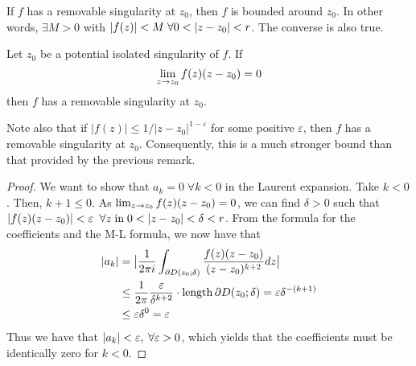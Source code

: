 \begin{remark}
    If $f$ has a removable singularity at $z_0$, then $f$ is bounded around $z_0$. In other words, $\exists M>0$ with $|f(z)|<M \fa 0<|z-z_0|<r$. The converse is also true.
\end{remark}

\begin{thm}
    Let $z_0$ be a potential isolated singularity of $f$. If
    \[\lim_{z\rightarrow z_0}f(z)(z-z_0)=0\]
    then $f$ has a removable singularity at $z_0$.
\end{thm}
\begin{remark}
    Note also that if $|f(z)|\leq 1/|z-z_0|^{1-\varepsilon}$ for some positive $\varepsilon$, then $f$ has a removable singularity at $z_0$.
    Consequently, this is a much stronger bound than that provided by the previous remark.
\end{remark}
\begin{proof}
    We want to show that $a_k=0\;\forall k<0$ in the Laurent expansion. Take $k<0$. Then, $k+1\leq0$.
    As $\lim_{z\rightarrow z_0}f(z)(z-z_0)=0$, we can find $\delta>0$ such that $|f(z)(z-z_0)|<\varepsilon\;\fa z \nm{in} 0<|z-z_0|<\delta<r$.
    From the formula for the coefficients and the M-L formula, we now have that
    \begin{align*}
        |a_k|&=\big|\frac{1}{2\pi i}\int_{\partial D(z_0;\delta)}\frac{f(z)(z-z_0)}{(z-z_0)^{k+2}}dz\big|\\
        &\leq \frac{1}{2\pi}\frac{\varepsilon}{\delta^{k+2}}\cdot \operatorname{length}\partial D(z_0; \delta)=\varepsilon\delta^{-(k+1)}\\
        &\leq \varepsilon\delta^0=\varepsilon
    \end{align*}
    Thus we have that $|a_k|<\varepsilon, \;\forall\varepsilon>0$, which yields that the coefficients must be identically zero for $k<0$.
\end{proof}

